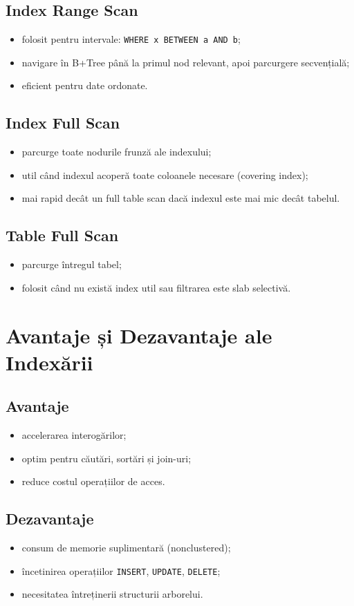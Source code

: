 \documentclass[12pt,a4paper]{article}
\begin{document}
\subsection*{Index Range Scan}
\begin{itemize}[noitemsep]
    \item folosit pentru intervale: \texttt{WHERE x BETWEEN a AND b};
    \item navigare în B+Tree până la primul nod relevant, apoi parcurgere secvențială;
    \item eficient pentru date ordonate.
\end{itemize}

\subsection*{Index Full Scan}
\begin{itemize}[noitemsep]
    \item parcurge toate nodurile frunză ale indexului;
    \item util când indexul acoperă toate coloanele necesare (covering index);
    \item mai rapid decât un full table scan dacă indexul este mai mic decât tabelul.
\end{itemize}

\subsection*{Table Full Scan}
\begin{itemize}[noitemsep]
    \item parcurge întregul tabel;
    \item folosit când nu există index util sau filtrarea este slab selectivă.
\end{itemize}

\section{Avantaje și Dezavantaje ale Indexării}

\subsection*{Avantaje}
\begin{itemize}[noitemsep]
    \item accelerarea interogărilor;
    \item optim pentru căutări, sortări și join-uri;
    \item reduce costul operațiilor de acces.
\end{itemize}

\subsection*{Dezavantaje}
\begin{itemize}[noitemsep]
    \item consum de memorie suplimentară (nonclustered);
    \item încetinirea operațiilor \texttt{INSERT}, \texttt{UPDATE}, \texttt{DELETE};
    \item necesitatea întreținerii structurii arborelui.
\end{itemize}
\end{document}
